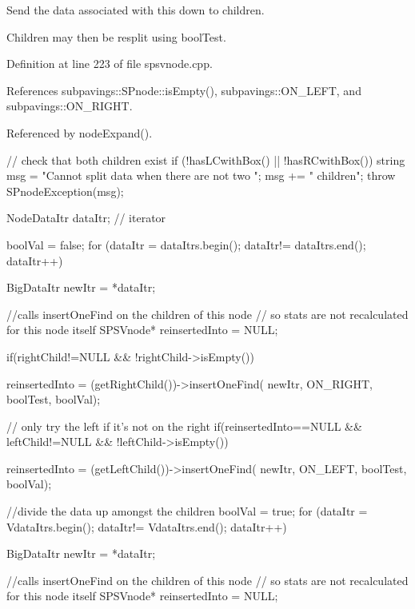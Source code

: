 \-Send the data associated with this down to children. 

\-Children may then be resplit using bool\-Test. 

\-Definition at line 223 of file spsvnode.\-cpp.



\-References subpavings\-::\-S\-Pnode\-::is\-Empty(), subpavings\-::\-O\-N\-\_\-\-L\-E\-F\-T, and subpavings\-::\-O\-N\-\_\-\-R\-I\-G\-H\-T.



\-Referenced by node\-Expand().


\begin{DoxyCode}
   {
        // check that both children exist
        if (!hasLCwithBox() || !hasRCwithBox()) {
            string msg = "Cannot split data when there are not two ";
            msg += " children";
            throw SPnodeException(msg);
        }

        NodeDataItr dataItr; // iterator
     
        boolVal = false;
        for (dataItr = dataItrs.begin();
            dataItr!= dataItrs.end(); dataItr++) {
            BigDataItr newItr = *dataItr;

            //calls insertOneFind on the children of this node
            // so stats are not recalculated for this node itself
            SPSVnode* reinsertedInto = NULL;

            if(rightChild!=NULL && !rightChild->isEmpty()) {

                reinsertedInto =
                    (getRightChild())->insertOneFind(
                    newItr, ON_RIGHT, boolTest, boolVal);
            }

            // only try the left if it's not on the right
            if(reinsertedInto==NULL && leftChild!=NULL
            && !leftChild->isEmpty()) {

                reinsertedInto =
                    (getLeftChild())->insertOneFind(
                    newItr, ON_LEFT, boolTest, boolVal);
            }
        }

        //divide the data up amongst the children
         boolVal = true;
         for (dataItr = VdataItrs.begin();
            dataItr!= VdataItrs.end(); dataItr++) {
            BigDataItr newItr = *dataItr;

            //calls insertOneFind on the children of this node
            // so stats are not recalculated for this node itself
            SPSVnode* reinsertedInto = NULL;

}}
\end{DoxyCode}
